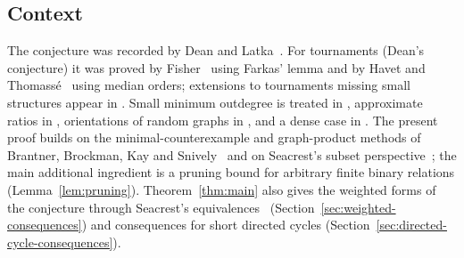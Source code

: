 \documentclass[11pt]{article}
\theoremstyle{remark}
\begin{document}
\subsection*{Context}
The conjecture was recorded by Dean and Latka~\cite{DeanLatka1995}. For
tournaments (Dean's conjecture) it was proved by Fisher~\cite{Fisher1996}
using Farkas' lemma and by Havet and Thomass\'e~\cite{HavetThomasse2000} using
median orders; extensions to tournaments missing small structures appear in
\cite{FidlerYuster2007,Ghazal2012,DaraFrancisJacobNarayanan2022,DaamouchAlMninyGhazal2025}.
Small minimum outdegree is treated in
\cite{KanekoLocke2001,SadhukhanSandeepSen2026}, approximate ratios in
\cite{ChenShenYuster2003,HuangPeng2024}, orientations of random graphs in
\cite{BotlerMouraNaia2023,EspunyDiazEtAl2025}, and a dense case in
\cite{Brukhman2026}. The present proof builds on the minimal-counterexample and
graph-product methods of Brantner, Brockman, Kay and
Snively~\cite{BrantnerBrockmanKaySnively2009} and on Seacrest's subset
perspective~\cite{Seacrest2019}; the main additional ingredient is a pruning
bound for arbitrary finite binary relations (Lemma~\ref{lem:pruning}).
Theorem~\ref{thm:main} also gives the weighted forms of the conjecture through
Seacrest's equivalences~\cite{Seacrest2015}
(Section~\ref{sec:weighted-consequences}) and consequences for short directed
cycles (Section~\ref{sec:directed-cycle-consequences}).
\end{document}
